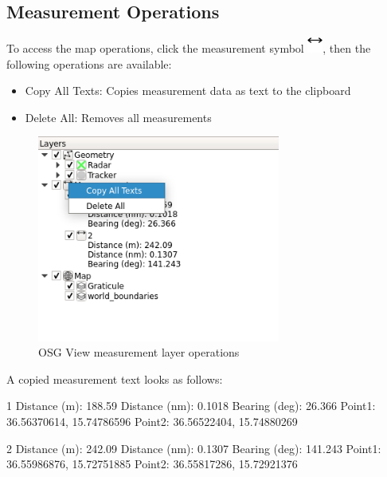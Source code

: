 \subsection{Measurement Operations}
\label{sec:osg_measure_ops}

To access the map operations, click the measurement symbol \includegraphics[width=0.5cm,frame]{../../data/icons/measure.png}, then the following operations are available:

\begin{itemize}
 \item Copy All Texts: Copies measurement data as text to the clipboard
 \item Delete All: Removes all measurements
\end{itemize} 

\begin{figure}[H]
    \includegraphics[width=8cm,frame]{../screenshots/osgview_measure_ops.png}
  \caption{OSG View measurement layer operations}
\end{figure}

A copied measurement text looks as follows:

\begin{cverbatim}
1
Distance (m): 188.59
Distance (nm): 0.1018
Bearing (deg): 26.366
Point1: 36.56370614, 15.74786596
Point2: 36.56522404, 15.74880269

2
Distance (m): 242.09
Distance (nm): 0.1307
Bearing (deg): 141.243
Point1: 36.55986876, 15.72751885
Point2: 36.55817286, 15.72921376
\end{cverbatim}
